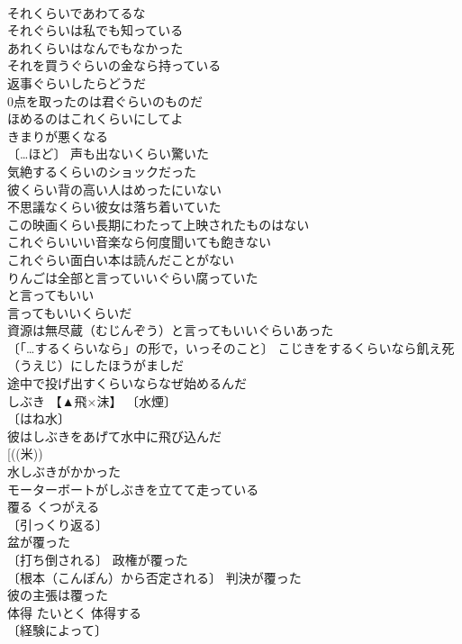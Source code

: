 \documentclass[8pt]{extreport}
\begin{document}
\begin{CJK}{UTF8}{min}
\\	それくらいであわてるな 
\\	それぐらいは私でも知っている 
\\	あれくらいはなんでもなかった 
\\	それを買うぐらいの金なら持っている 
\\	返事ぐらいしたらどうだ 
\\	0点を取ったのは君ぐらいのものだ 
\\	ほめるのはこれくらいにしてよ
\\	きまりが悪くなる 
\\	〔…ほど〕 声も出ないくらい驚いた 
\\	気絶するくらいのショックだった 
\\	彼くらい背の高い人はめったにいない 
\\	不思議なくらい彼女は落ち着いていた 
\\	この映画くらい長期にわたって上映されたものはない 
\\	これぐらいいい音楽なら何度聞いても飽きない 
\\	これぐらい面白い本は読んだことがない 
\\	りんごは全部と言っていいぐらい腐っていた
\\	と言ってもいい 
\\	言ってもいいくらいだ 
\\	資源は無尽蔵（むじんぞう）と言ってもいいぐらいあった 
\\	〔「…するくらいなら」の形で，いっそのこと〕 こじきをするくらいなら飢え死（うえじ）にしたほうがましだ 
\\	途中で投げ出すくらいならなぜ始めるんだ 
\\	しぶき	【▲飛×沫】	〔水煙〕
\\	〔はね水〕
\\	彼はしぶきをあげて水中に飛び込んだ 
\\	[((米)) 
\\	水しぶきがかかった 
\\	モーターボートがしぶきを立てて走っている 
\\	覆る	くつがえる	
\\	〔引っくり返る〕
\\	盆が覆った 
\\	〔打ち倒される〕 政権が覆った 
\\	〔根本（こんぽん）から否定される〕 判決が覆った 
\\	彼の主張は覆った 
\\	体得	たいとく	体得する 
\\	〔経験によって〕

\end{CJK}
\end{document}
